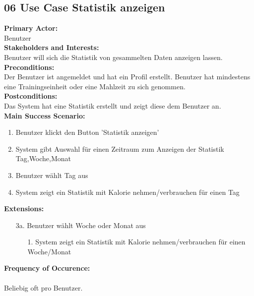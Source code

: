 \documentclass[12pt,a4paper,onecolumn]{article}
\begin{document}
\subsection{06 Use Case Statistik anzeigen}
\textbf{Primary Actor:}\\ Benutzer\\
\textbf{Stakeholders and Interests:}\\
Benutzer will sich die Statistik von gesammelten Daten anzeigen lassen. \\
\textbf{Preconditions:} \\ Der Benutzer ist angemeldet und hat ein Profil erstellt. Benutzer hat mindestens eine \gls{Trainingseinheit} oder eine \gls{Mahlzeit} zu sich genommen. \\
\textbf{Postconditions:}\\Das System hat eine Statistik erstellt und zeigt diese dem Benutzer an.\\
\textbf{Main Success Scenario:}
\begin{enumerate}
    \item Benutzer klickt den Button 'Statistik anzeigen'
    \item System gibt Auswahl für einen Zeitraum zum Anzeigen der Statistik Tag,Woche,Monat
    \item Benutzer wählt Tag aus
    \item System zeigt ein Statistik mit Kalorie nehmen/verbrauchen für einen Tag
\end{enumerate}
\textbf{Extensions:}
\begin{enumerate}
    \item [3a.]  Benutzer wählt Woche oder Monat aus
    \begin{enumerate}
        \item[1.]System zeigt ein Statistik mit Kalorie nehmen/verbrauchen für einen Woche/Monat
    \end{enumerate}
\end{enumerate}
\textbf{Frequency of Occurence:}\\ \\
Beliebig oft pro Benutzer.
\end{document}
